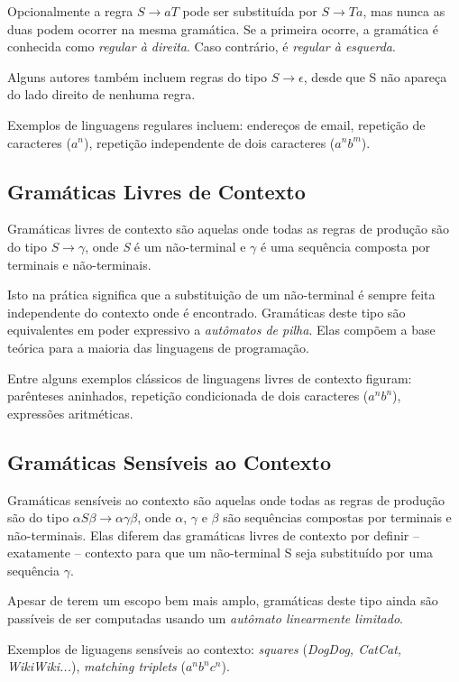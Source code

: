 \documentclass[a4paper,12pt,oneside,onecolumn]{uerj}
\begin{document}
Opcionalmente a regra $S \rightarrow aT$ pode ser substituída por $S \rightarrow Ta$, mas nunca as duas podem ocorrer na mesma gramática. Se a primeira ocorre, a gramática é conhecida como \emph{regular à direita}. Caso contrário, é \emph{regular à esquerda}.

Alguns autores também incluem regras do tipo $S \rightarrow \epsilon$, desde que S não apareça do lado direito de nenhuma regra.

Exemplos de linguagens regulares incluem: endereços de email, repetição de caracteres ($a^n$), repetição independente de dois caracteres ($a^nb^m$).

\subsection{Gramáticas Livres de Contexto}

Gramáticas livres de contexto são aquelas onde todas as regras de produção são do tipo $S \rightarrow \gamma$, onde \emph{S} é um não-terminal e $\gamma$ é uma sequência composta por terminais e não-terminais. 

Isto na prática significa que a substituição de um não-terminal é sempre feita independente do contexto onde é encontrado. Gramáticas deste tipo são equivalentes em poder expressivo a \emph{autômatos de pilha}. Elas compõem a base teórica para a maioria das linguagens de programação. 

Entre alguns exemplos clássicos de linguagens livres de contexto figuram: parênteses aninhados, repetição condicionada de dois caracteres ($a^nb^n$), expressões aritméticas.

\subsection{Gramáticas Sensíveis ao Contexto}
Gramáticas sensíveis ao contexto são aquelas onde todas as regras de produção são do tipo $\alpha S\beta\rightarrow \alpha\gamma\beta$, onde $\alpha$, $\gamma$ e $\beta$ são sequências compostas por terminais e não-terminais. Elas diferem das gramáticas livres de contexto por definir -- exatamente -- contexto para que um não-terminal S seja substituído por uma sequência $\gamma$. 

Apesar de terem um escopo bem mais amplo, gramáticas deste tipo ainda são passíveis de ser computadas usando um \emph{autômato linearmente limitado}. 

Exemplos de liguagens sensíveis ao contexto: \emph{squares} (\emph{DogDog, CatCat, WikiWiki...}), \emph{matching triplets} ($a^nb^nc^n$).
\end{document}
